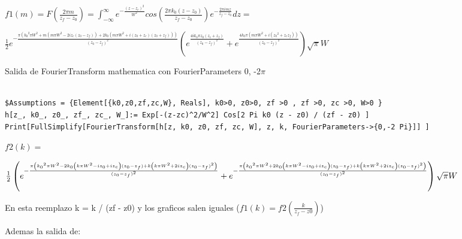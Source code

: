 \documentclass{article}
\begin{document}
$
f1(m)=F( \frac{2\pi m}{z_f - z_0} ) = \int_{- \infty}^{\infty}{e^{-\frac{(z-z_c)^2}{W^2}} cos(\frac{2 \pi k_0 (z-z_0)}{z_f - z_0}) e^{-\frac{2 \pi i m z }{z_f - z_0}} dz } = $

$\frac{1}{2} e^{-\frac{\pi  \left(\text{$k_0$}^2 \pi  W^2+m \left(m \pi  W^2-2 i \text{$z_c$} (\text{$z_0$}-\text{$z_f$})\right)+2 \text{$k_0$} \left(m \pi  W^2+i
(\text{$z_0$}+\text{$z_c$}) (\text{$z_0$}+\text{$z_f$})\right)\right)}{(\text{$z_0$}-\text{$z_f$})^2}} \left(e^{\frac{4 i \text{$k_0$} \pi  \text{$z_0$} (\text{$z_c$}+\text{$z_f$})}{(\text{$z_0$}-\text{$z_f$})^2}}+e^{\frac{4
\text{$k_0$} \pi  \left(m \pi  W^2+i \left(\text{$z_0$}^2+\text{$z_c$} \text{$z_f$}\right)\right)}{(\text{$z_0$}-\text{$z_f$})^2}}\right) \sqrt{\pi } W$


Salida de FourierTransform mathematica con FourierParameters 0, -2$\pi$ 

\begin{verbatim}

$Assumptions = {Element[{k0,z0,zf,zc,W}, Reals], k0>0, z0>0, zf >0 , zf >0, zc >0, W>0 }
h[z_, k0_, z0_, zf_, zc_, W_]:= Exp[-(z-zc)^2/W^2] Cos[2 Pi k0 (z - z0) / (zf - z0) ]
Print[FullSimplify[FourierTransform[h[z, k0, z0, zf, zc, W], z, k, FourierParameters->{0,-2 Pi}]] ]

\end{verbatim}
$f2(k)=$

$\frac{1}{2} \left(e^{-\frac{\pi  \left(\text{$k_0$}^2 \pi  W^2-2 \text{$k_0$} \left(k \pi  W^2-i \text{$z_0$}+i \text{$z_c$}\right) (\text{$z_0$}-\text{$z_f$})+k
\left(k \pi  W^2+2 i \text{$z_c$}\right) (\text{$z_0$}-\text{$z_f$})^2\right)}{(\text{$z_0$}-\text{$z_f$})^2}}+ \\
e^{-\frac{\pi  \left(\text{$k_0$}^2 \pi  W^2+2 \text{$k_0$}
\left(k \pi  W^2-i \text{$z_0$}+i \text{$z_c$}\right) (\text{$z_0$}-\text{$z_f$})+k \left(k \pi  W^2+2 i \text{$z_c$}\right) (\text{$z_0$}-\text{$z_f$})^2\right)}{(\text{$z_0$}-\text{$z_f$})^2}}\right)
\sqrt{\pi } W$

En esta reemplazo k = k / (zf - z0) y los graficos salen iguales ($f1(k) = f2(\frac{k}{z_f - z0})$)


Ademas la salida de:
\end{document}
